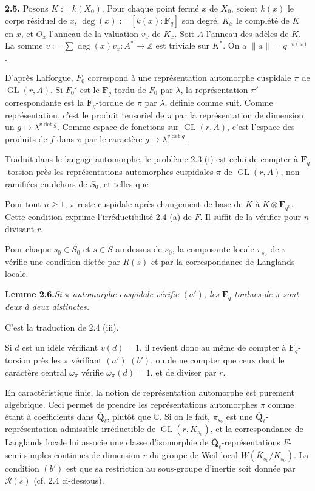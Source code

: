 \documentclass[11pt]{article}
\newcommand{\Fq}{\mathbf{F}_q}
\newcommand{\Fqn}{\mathbf{F}_{q^n}}
\newcommand{\Qbl}{\overline{\mathbf{Q}}_{\ell}}
\newcommand{\GL}{\operatorname{GL}}
\newcommand{\Z}{\mathbb{Z}}
\newcommand{\C}{\mathbb{C}}
\newcommand{\Rcal}{\mathcal{R}}
\newcommand{\para}[1]{\medskip\noindent\textbf{#1}\enspace}
\begin{document}
\para{2.5.} Posons \(K:=k(X_0)\). Pour chaque point fermé \(x\) de \(X_0\), soient \(k(x)\) le corps résiduel de \(x\), \(\deg(x):=[k(x):\Fq]\) son degré, \(K_x\) le complété de \(K\) en \(x\), et \(O_x\) l'anneau de la valuation \(v_x\) de \(K_x\). Soit \(A\) l'anneau des adèles de \(K\). La somme \(v:=\sum \deg(x)v_x:A^*\to\Z\) est triviale sur \(K^*\). On a \(\|a\|=q^{-v(a)}\).

D'après Lafforgue, \(F_0\) correspond à une représentation automorphe cuspidale \(\pi\) de \(\GL(r,A)\). Si \(F_0'\) est le \(\Fq\)-tordu de \(F_0\) par \(\lambda\), la représentation \(\pi'\) correspondante est la \(\Fq\)-tordue de \(\pi\) par \(\lambda\), définie comme suit. Comme représentation, c'est le produit tensoriel de \(\pi\) par la représentation de dimension un \(g\mapsto\lambda^{v\det g}\). Comme espace de fonctions sur \(\GL(r,A)\), c'est l'espace des produits de \(f\) dans \(\pi\) par le caractère \(g\mapsto\lambda^{v\det g}\).

Traduit dans le langage automorphe, le problème 2.3 (i) est celui de compter à \(\Fq\)-torsion près les représentations automorphes cuspidales \(\pi\) de \(\GL(r,A)\), non ramifiées en dehors de \(S_0\), et telles que
\begin{description}[leftmargin=2.5em,style=nextline]
\item[\((a')\)] Pour tout \(n\ge 1\), \(\pi\) reste cuspidale après changement de base de \(K\) à \(K\otimes\Fqn\). Cette condition exprime l'irréductibilité 2.4 (a) de \(F\). Il suffit de la vérifier pour \(n\) divisant \(r\).
\item[\((b')\)] Pour chaque \(s_0\in S_0\) et \(s\in S\) au-dessus de \(s_0\), la composante locale \(\pi_{s_0}\) de \(\pi\) vérifie une condition dictée par \(R(s)\) et par la correspondance de Langlands locale.
\end{description}

\noindent\textbf{Lemme 2.6.}\quad\textit{Si \(\pi\) automorphe cuspidale vérifie \((a')\), les \(\Fq\)-tordues de \(\pi\) sont deux à deux distinctes.}

C'est la traduction de 2.4 (iii).

Si \(d\) est un idèle vérifiant \(v(d)=1\), il revient donc au même de compter à \(\Fq\)-torsion près les \(\pi\) vérifiant \((a')\) \((b')\), ou de ne compter que ceux dont le caractère central \(\omega_\pi\) vérifie \(\omega_\pi(d)=1\), et de diviser par \(r\).

En caractéristique finie, la notion de représentation automorphe est purement algébrique. Ceci permet de prendre les représentations automorphes \(\pi\) comme étant à coefficients dans \(\Qbl\), plutôt que \(\C\). Si on le fait, \(\pi_{s_0}\) est une \(\Qbl\)-représentation admissible irréductible de \(\GL(r,K_{s_0})\), et la correspondance de Langlands locale lui associe une classe d'isomorphie de \(\Qbl\)-représentations \(F\)-semi-simples continues de dimension \(r\) du groupe de Weil local \(W(\overline K_{s_0}/K_{s_0})\). La condition \((b')\) est que sa restriction au sous-groupe d'inertie soit donnée par \(\Rcal(s)\) (cf. 2.4 ci-dessous).
\end{document}
